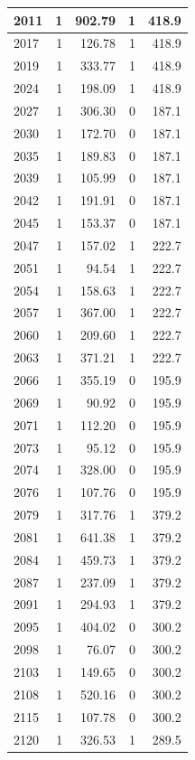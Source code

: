 \documentclass[
  spanish,
  12pt,
]{book}
\begin{document}
\begin{tabular}{l|r|r|r|r}
\hline
2011 & 1 & 902.79 & 1 & 418.9\\
\hline
2017 & 1 & 126.78 & 1 & 418.9\\
\hline
2019 & 1 & 333.77 & 1 & 418.9\\
\hline
2024 & 1 & 198.09 & 1 & 418.9\\
\hline
2027 & 1 & 306.30 & 0 & 187.1\\
\hline
2030 & 1 & 172.70 & 0 & 187.1\\
\hline
2035 & 1 & 189.83 & 0 & 187.1\\
\hline
2039 & 1 & 105.99 & 0 & 187.1\\
\hline
2042 & 1 & 191.91 & 0 & 187.1\\
\hline
2045 & 1 & 153.37 & 0 & 187.1\\
\hline
2047 & 1 & 157.02 & 1 & 222.7\\
\hline
2051 & 1 & 94.54 & 1 & 222.7\\
\hline
2054 & 1 & 158.63 & 1 & 222.7\\
\hline
2057 & 1 & 367.00 & 1 & 222.7\\
\hline
2060 & 1 & 209.60 & 1 & 222.7\\
\hline
2063 & 1 & 371.21 & 1 & 222.7\\
\hline
2066 & 1 & 355.19 & 0 & 195.9\\
\hline
2069 & 1 & 90.92 & 0 & 195.9\\
\hline
2071 & 1 & 112.20 & 0 & 195.9\\
\hline
2073 & 1 & 95.12 & 0 & 195.9\\
\hline
2074 & 1 & 328.00 & 0 & 195.9\\
\hline
2076 & 1 & 107.76 & 0 & 195.9\\
\hline
2079 & 1 & 317.76 & 1 & 379.2\\
\hline
2081 & 1 & 641.38 & 1 & 379.2\\
\hline
2084 & 1 & 459.73 & 1 & 379.2\\
\hline
2087 & 1 & 237.09 & 1 & 379.2\\
\hline
2091 & 1 & 294.93 & 1 & 379.2\\
\hline
2095 & 1 & 404.02 & 0 & 300.2\\
\hline
2098 & 1 & 76.07 & 0 & 300.2\\
\hline
2103 & 1 & 149.65 & 0 & 300.2\\
\hline
2108 & 1 & 520.16 & 0 & 300.2\\
\hline
2115 & 1 & 107.78 & 0 & 300.2\\
\hline
2120 & 1 & 326.53 & 1 & 289.5\\

\end{tabular}
\end{document}
